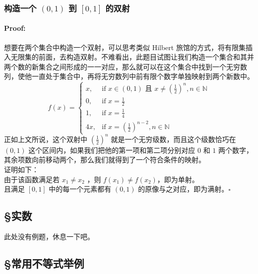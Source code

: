 \documentclass{article}
\begin{document}
\subsubsection{构造一个 $(0, 1)$ 到 $[0, 1]$ 的双射}
\paragraph{Proof:}
想要在两个集合中构造一个双射，可以思考类似 Hilbert 旅馆的方式，将有限集插入无限集的前面，去构造双射。不难看出，此题目试图让我们构造一个集合和其并两个数的新集合之间形成的一一对应，那么就可以在这个集合中找到一个无穷数列，使他一直处于集合中，再将无穷数列中前有限个数字单独映射到两个新数中。\\
\[
f(x) =
\begin{cases}
    x,  & \text{if } x \in (0, 1) \text{ 且 } x \neq (\frac{1}{2})^n, n \in \mathbb{N} \\
    0,  & \text{if } x = \frac{1}{2} \\
    1,  & \text{if } x = \frac{1}{4} \\
    4x, & \text{if } x = (\frac{1}{2})^{n - 2}, n \in \mathbb{N}
\end{cases}
\]
正如上文所说，这个双射中 $(\frac{1}{2})^n$ 就是一个无穷级数，而且这个级数恰巧在 $(0, 1)$ 这个区间内，如果我们把他的第一项和第二项分别对应 $0$ 和 $1$ 两个数字，其余项数向前移动两个，那么我们就得到了一个符合条件的映射。\\
证明如下：\\
由于该函数满足若 $x_1 \neq x_2$ ，则 $f(x_1) \neq f(x_2)$，即为单射。\\
且满足 $[0, 1]$ 中的每一个元素都有 $(0, 1)$ 的原像与之对应，即为满射。$\square$ \\
\subsection{\S 实数}
此处没有例题，休息一下吧。
\subsection{\S 常用不等式举例}
\end{document}

